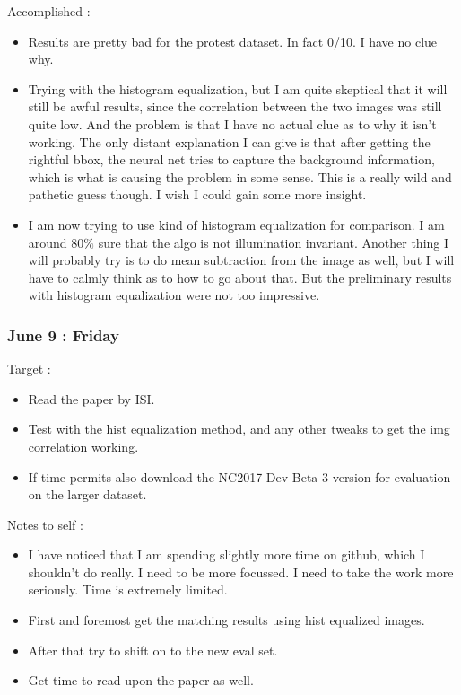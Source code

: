 \documentclass{article}
\begin{document}
Accomplished :
\begin{itemize}
\item Results are pretty bad for the protest dataset. In fact 0/10. I have no clue why.
\item Trying with the histogram equalization, but I am quite skeptical that it will still be awful results, since the correlation between the two images was still quite low. And the problem is that I have no actual clue as to why it isn't working. The only distant explanation I can give is that after getting the rightful bbox, the neural net tries to capture the background information, which is what is causing the problem in some sense. This is a really wild and pathetic guess though. I wish I could gain some more insight.
\item I am now trying to use kind of histogram equalization for comparison. I am around $80\%$ sure that the algo is not illumination invariant. Another thing I will probably try is to do mean subtraction from the image as well, but I will have to calmly think as to how to go about that. But the preliminary results with histogram equalization were not too impressive.
\end{itemize}

\subsubsection{June 9 : Friday}
Target :
\begin{itemize}
\item Read the paper by ISI.
\item Test with the hist equalization method, and any other tweaks to get the img correlation working.
\item If time permits also download the NC2017 Dev Beta 3 version for evaluation on the larger dataset.
\end{itemize}

Notes to self :
\begin{itemize}
\item I have noticed that I am spending slightly more time on github, which I shouldn't do really. I need to be more focussed. I need to take the work more seriously. Time is extremely limited.
\item First and foremost get the matching results using hist equalized images.
\item After that try to shift on to the new eval set.
\item Get time to read upon the paper as well.
\end{itemize}
\end{document}
